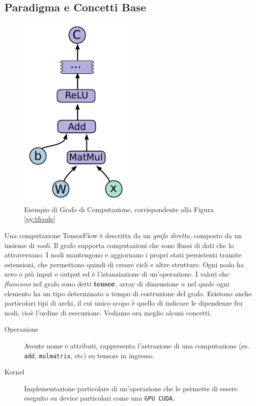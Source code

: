 \documentclass[DIV=calc, paper=a4, fontsize=11pt]{scrartcl}	 %
\begin{document}
\begin{multicols}{2}
		\section{Paradigma e Concetti Base}
			\begin{figure}[H]
				\centering
				\includegraphics[scale=.9]{img/computation.png}
				\caption{Esempio di Grafo di Computazione, corrispondente alla Figura \ref{py:tfcode}}
				\label{fig:computation}
			\end{figure}
			Una computazione TensorFlow è descritta da un \textit{grafo diretto}, composto da un insieme di \textit{nodi}. Il grafo supporta computazioni che sono flussi di dati che lo attraversano. I nodi mantengono e aggiornano i propri stati persistenti tramite estensioni, che permettono quindi di creare cicli e altre strutture. Ogni nodo ha zero o più input e output ed è l'istanziazione di un'operazione. I valori che \textit{fluiscono} nel grafo sono detti \textbf{tensor}, array di dimensione $n$ nel quale ogni elemento ha un tipo determinato a tempo di costruzione del grafo. Esistono anche particolari tipi di archi, il cui unico scopo è quello di indicare le dipendenze fra nodi, cioè l'ordine di esecuzione. Vediamo ora meglio alcuni concetti.
			\begin{description}
				\item[Operazione] Avente nome e attributi, rappresenta l'astrazione di una computazione (es. \texttt{add}, \texttt{mulmatrix}, etc) su tensors in ingresso.
				\item[Kernel] Implementazione particolare di un'operazione che le permette di essere eseguito su device particolari come una \texttt{GPU CUDA}.

\end{description}
\end{multicols}
\end{document}
